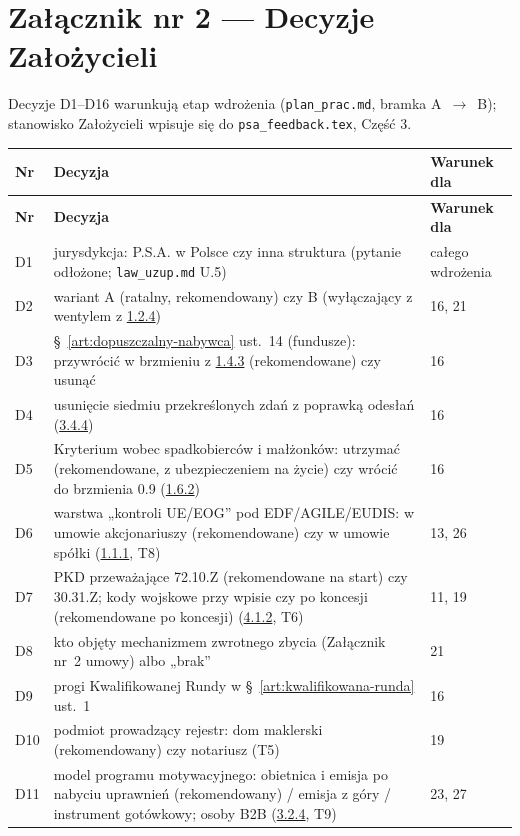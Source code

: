 \documentclass[12pt,a4paper]{report}
\begin{document}
\section*{Załącznik nr 2 --- Decyzje Założycieli}

Decyzje D1--D16 warunkują etap wdrożenia (\texttt{plan\_prac.md}, bramka A~$\rightarrow$~B); stanowisko Założycieli wpisuje się do \texttt{psa\_feedback.tex}, Część 3.

\begin{longtable}{@{}p{1.2cm} p{9.3cm} p{3.7cm}@{}}
\toprule
\textbf{Nr} & \textbf{Decyzja} & \textbf{Warunek dla} \\
\midrule
\endfirsthead
\toprule
\textbf{Nr} & \textbf{Decyzja} & \textbf{Warunek dla} \\
\midrule
\endhead
D1 & jurysdykcja: P.S.A. w Polsce czy inna struktura (pytanie odłożone; \texttt{law\_uzup.md} U.5) & całego wdrożenia \\
D2 & wariant A (ratalny, rekomendowany) czy B (wyłączający z wentylem z \hyperref[memo:1.2.4]{1.2.4}) & 16, 21 \\
D3 & §~\ref{art:dopuszczalny-nabywca} ust.~14 (fundusze): przywrócić w brzmieniu z \hyperref[memo:1.4.3]{1.4.3} (rekomendowane) czy usunąć & 16 \\
D4 & usunięcie siedmiu przekreślonych zdań z poprawką odesłań (\hyperref[memo:3.4.4]{3.4.4}) & 16 \\
D5 & Kryterium wobec spadkobierców i małżonków: utrzymać (rekomendowane, z ubezpieczeniem na życie) czy wrócić do brzmienia 0.9 (\hyperref[memo:1.6.2]{1.6.2}) & 16 \\
D6 & warstwa „kontroli UE/EOG” pod EDF/AGILE/EUDIS: w umowie akcjonariuszy (rekomendowane) czy w umowie spółki (\hyperref[memo:1.1.1]{1.1.1}, T8) & 13, 26 \\
D7 & PKD przeważające 72.10.Z (rekomendowane na start) czy 30.31.Z; kody wojskowe przy wpisie czy po koncesji (rekomendowane po koncesji) (\hyperref[memo:4.1.2]{4.1.2}, T6) & 11, 19 \\
D8 & kto objęty mechanizmem zwrotnego zbycia (Załącznik nr~2 umowy) albo „brak” & 21 \\
D9 & progi Kwalifikowanej Rundy w §~\ref{art:kwalifikowana-runda} ust.~1 & 16 \\
D10 & podmiot prowadzący rejestr: dom maklerski (rekomendowany) czy notariusz (T5) & 19 \\
D11 & model programu motywacyjnego: obietnica i emisja po nabyciu uprawnień (rekomendowany) / emisja z góry / instrument gotówkowy; osoby B2B (\hyperref[memo:3.2.4]{3.2.4}, T9) & 23, 27 \\

\end{longtable}
\end{document}

